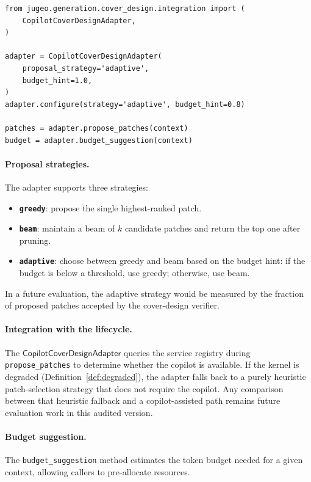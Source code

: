 \documentclass[11pt]{article}
\newcommand{\CCD}{\mathsf{CopilotCoverDesignAdapter}}
\begin{document}
\begin{lstlisting}[style=jugeo-python, caption={Using the
  $\CCD$ to propose patches.}]
from jugeo.generation.cover_design.integration import (
    CopilotCoverDesignAdapter,
)

adapter = CopilotCoverDesignAdapter(
    proposal_strategy='adaptive',
    budget_hint=1.0,
)
adapter.configure(strategy='adaptive', budget_hint=0.8)

patches = adapter.propose_patches(context)
budget = adapter.budget_suggestion(context)
\end{lstlisting}

\paragraph{Proposal strategies.}
The adapter supports three strategies:
\begin{itemize}[leftmargin=*]
  \item \textbf{\texttt{greedy}}: propose the single highest-ranked
        patch.
  \item \textbf{\texttt{beam}}: maintain a beam of $k$ candidate
        patches and return the top one after pruning.
  \item \textbf{\texttt{adaptive}}: choose between greedy and beam
        based on the budget hint: if the budget is below a
        threshold, use greedy; otherwise, use beam.
\end{itemize}

In a future evaluation, the adaptive strategy would be measured by the
fraction of proposed patches accepted by the cover-design verifier.

\paragraph{Integration with the lifecycle.}
The $\CCD$ queries the service registry during
\texttt{propose\_patches} to determine whether the copilot is
available.  If the kernel is degraded
(Definition~\ref{def:degraded}), the adapter falls back to a
purely heuristic patch-selection strategy that does not require
the copilot.  Any comparison between that heuristic fallback and a
copilot-assisted path remains future evaluation work in this audited
version.

\paragraph{Budget suggestion.}
The \texttt{budget\_suggestion} method estimates the token budget
needed for a given context, allowing callers to pre-allocate
resources.
\end{document}

